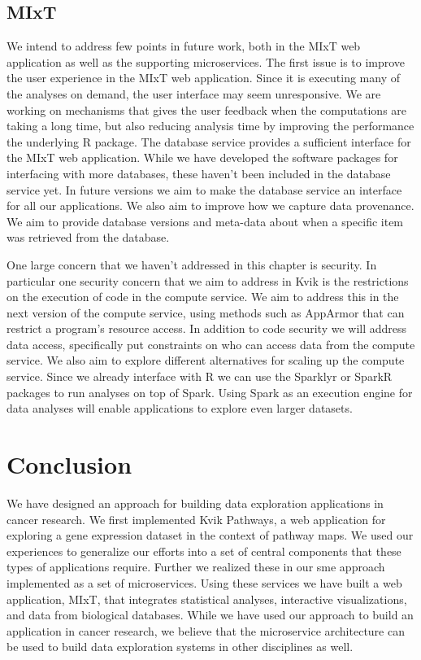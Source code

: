 \subsection{MIxT} 
We intend to address few points in future work, both in the
MIxT web application as well as the supporting microservices.  The first issue
is to improve the user experience in the MIxT web application.  Since it is
executing many of the analyses on demand, the user interface may seem
unresponsive. We are working on mechanisms that gives the user feedback when the
computations are taking a long time, but also reducing analysis time by
improving the performance the underlying R package. The database service
provides a sufficient interface for the MIxT web application. While we have
developed the software packages for interfacing with more databases, these
haven't been included in the database service yet. In future versions we aim to
make the database service an interface for all our applications.  We also aim to
improve how we capture data provenance. We aim to provide database versions and
meta-data about when a specific item was retrieved from the database. 

One large concern that we haven't addressed in this chapter is security. In
particular one security concern that we aim to address in Kvik is the
restrictions on the execution of code in the compute service. We aim to address
this in the next version of the compute service, using methods such as
AppArmor\cite{apparmor} that can restrict a program's resource access. In
addition to code security we will address data access, specifically put
constraints on who can access data from the compute service.  We also aim to
explore different alternatives for scaling up the compute service.  Since we
already interface with R we can use the Sparklyr\cite{sparklyr} or
SparkR\cite{sparkr} packages to run analyses on top of
Spark.\cite{zaharia2012resilient} Using Spark as an execution engine for data
analyses will enable applications to explore even larger datasets.

\section{Conclusion}
We have designed an approach for building data exploration applications in
cancer research. We first implemented Kvik Pathways, a web application for
exploring a gene expression dataset in the context of pathway maps. We used our
experiences to generalize our efforts into a set of central components that
these types of applications require. Further we realized these in our \gls{sme}
approach implemented as a set of microservices.  Using these services we have
built a web application, MIxT, that integrates statistical analyses, interactive
visualizations, and data from biological databases. While we have used our
approach to build an application in cancer research, we believe that the
microservice architecture can be used to build data exploration systems in other
disciplines as well. 

